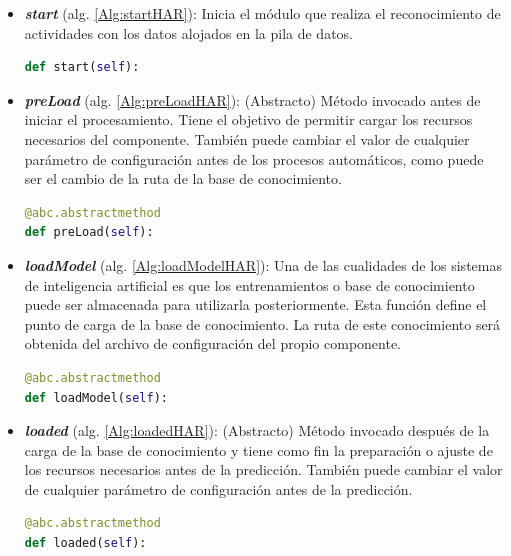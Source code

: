         \begin{itemize}
        
            \item \textbf{\textit{start}} (alg. \ref{Alg:startHAR}): 
            Inicia el módulo que realiza el reconocimiento de actividades con los datos alojados en la pila de datos.
            \begin{lstlisting}[language=Python, caption={Firma del método ``\textit{start}'' de la clase ActivityRecognizer.}, label=Alg:startHAR, numbers=none]
def start(self):
            \end{lstlisting}
            
            \item \textbf{\textit{preLoad}} (alg. \ref{Alg:preLoadHAR}):
            (Abstracto) Método invocado antes de iniciar el procesamiento. Tiene el objetivo de permitir cargar los recursos necesarios del componente. También puede cambiar el valor de cualquier parámetro de configuración antes de los procesos automáticos, como puede ser el cambio de la ruta de la base de conocimiento. 
            \begin{lstlisting}[language=Python, caption={Firma del método ``\textit{preLoad}'' de la clase ActivityRecognizer.}, label=Alg:preLoadHAR, numbers=none]
@abc.abstractmethod
def preLoad(self):
            \end{lstlisting}
            
            \item \textbf{\textit{loadModel}} (alg. \ref{Alg:loadModelHAR}):
            Una de las cualidades de los sistemas de inteligencia artificial es que los entrenamientos o base de conocimiento puede ser almacenada para utilizarla posteriormente. Esta función define el punto de carga de la base de conocimiento. La ruta de este conocimiento será obtenida del archivo de configuración del propio componente. 
            \begin{lstlisting}[language=Python, caption={Firma del método ``\textit{loadModel}'' de la clase ActivityRecognizer.}, label=Alg:loadModelHAR, numbers=none]
@abc.abstractmethod
def loadModel(self):

            \end{lstlisting}
            
            \item \textbf{\textit{loaded}} (alg. \ref{Alg:loadedHAR}):
            (Abstracto) Método invocado después de la carga de la base de conocimiento y tiene como fin la preparación o ajuste de los recursos necesarios antes de la predicción. También puede cambiar el valor de cualquier parámetro de configuración antes de la predicción. 
            \begin{lstlisting}[language=Python, caption={Firma del método ``\textit{loaded}'' de la clase ActivityRecognizer.}, label=Alg:loadedHAR, numbers=none]
@abc.abstractmethod
def loaded(self):
            \end{lstlisting}
            

\end{itemize}
